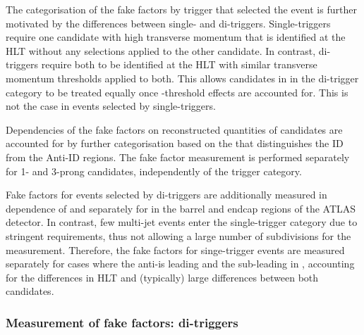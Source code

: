 The categorisation of the fake factors by trigger that selected the
event is further motivated by the differences between single- and
di-\tauhadvis triggers. Single-\tauhadvis triggers require one
\tauhadvis candidate with high transverse momentum that is identified
at the HLT without any selections applied to the other candidate. In
contrast, di-\tauhadvis triggers require both \tauhadvis to be
identified at the HLT with similar transverse momentum thresholds
applied to both. This allows \tauhadvis candidates in in the
di-\tauhadvis trigger category to be treated equally once
\pT-threshold effects are accounted for. This is not the case in
events selected by single-\tauhadvis triggers.

Dependencies of the fake factors on reconstructed quantities of
\tauhadvis candidates are accounted for by further categorisation
based on the \tauhadvis that distinguishes the ID from the Anti-ID
regions. The fake factor measurement is performed separately for 1-
and 3-prong \tauhadvis candidates, independently of the trigger
category.

Fake factors for events selected by di-\tauhadvis triggers are
additionally measured in dependence of \tauhadvis \pT and separately
for \tauhadvis in the barrel and endcap regions of the ATLAS
detector. In contrast, few multi-jet events enter the
single-\tauhadvis trigger category due to stringent \pT requirements,
thus not allowing a large number of subdivisions for the
measurement. Therefore, the fake factors for singe-\tauhadvis trigger
events are measured separately for cases where the anti-\tauhadvis is
leading and the sub-leading in \pT, accounting for the differences in
HLT \tauid and (typically) large \tauhadvis \pT differences between
both candidates.


\subsubsection{Measurement of fake factors: di-\tauhadvis triggers}

